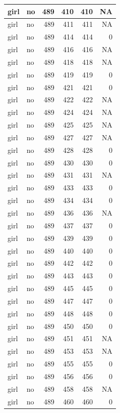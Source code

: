 \documentclass[man]{apa6}
\begin{document}
\begin{tabular}{l|l|r|r|r|r}
\hline
girl & no & 489 & 410 & 410 & NA\\
\hline
girl & no & 489 & 411 & 411 & NA\\
\hline
girl & no & 489 & 414 & 414 & 0\\
\hline
girl & no & 489 & 416 & 416 & NA\\
\hline
girl & no & 489 & 418 & 418 & NA\\
\hline
girl & no & 489 & 419 & 419 & 0\\
\hline
girl & no & 489 & 421 & 421 & 0\\
\hline
girl & no & 489 & 422 & 422 & NA\\
\hline
girl & no & 489 & 424 & 424 & NA\\
\hline
girl & no & 489 & 425 & 425 & NA\\
\hline
girl & no & 489 & 427 & 427 & NA\\
\hline
girl & no & 489 & 428 & 428 & 0\\
\hline
girl & no & 489 & 430 & 430 & 0\\
\hline
girl & no & 489 & 431 & 431 & NA\\
\hline
girl & no & 489 & 433 & 433 & 0\\
\hline
girl & no & 489 & 434 & 434 & 0\\
\hline
girl & no & 489 & 436 & 436 & NA\\
\hline
girl & no & 489 & 437 & 437 & 0\\
\hline
girl & no & 489 & 439 & 439 & 0\\
\hline
girl & no & 489 & 440 & 440 & 0\\
\hline
girl & no & 489 & 442 & 442 & 0\\
\hline
girl & no & 489 & 443 & 443 & 0\\
\hline
girl & no & 489 & 445 & 445 & 0\\
\hline
girl & no & 489 & 447 & 447 & 0\\
\hline
girl & no & 489 & 448 & 448 & 0\\
\hline
girl & no & 489 & 450 & 450 & 0\\
\hline
girl & no & 489 & 451 & 451 & NA\\
\hline
girl & no & 489 & 453 & 453 & NA\\
\hline
girl & no & 489 & 455 & 455 & 0\\
\hline
girl & no & 489 & 456 & 456 & 0\\
\hline
girl & no & 489 & 458 & 458 & NA\\
\hline
girl & no & 489 & 460 & 460 & 0\\

\end{tabular}
\end{document}
